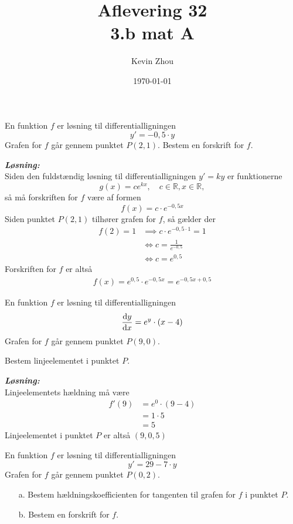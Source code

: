 \documentclass{article}
\title{Aflevering 32\\
{\Large \textbf{3.b mat A}}}
\author{Kevin Zhou}
\date{\today}
\newcommand{\sol}{\setlength{\parindent}{0cm}\textbf{\textit{Løsning:}}\setlength{\parindent}{1cm}}
\begin{document}
\maketitle
\pagebreak
\begin{question}{}{}
  En funktion $f$ er løsning til differentialligningen
  \[
  y'=-0,5 \cdot y
  \] 
  Grafen for $f$ går gennem punktet $P(2,1)$. 
  Bestem en forskrift for $f$.
\end{question}
\sol \\
Siden den fuldstændig løsning til differentialligningen $y'=ky$ er funktionerne
\[
g(x)= ce^{kx}, \quad c \in \mathbb{R}, x \in \mathbb{R},
\] 
så må forskriften for $f$ være af formen
\[
f(x)= c \cdot e^{-0,5x} 
\] 
Siden punktet $P(2,1)$ tilhører grafen for $f$, så gælder der
\begin{equation*}
\begin{split}
  f(2)= 1 &\implies c \cdot e^{-0,5 \cdot 1} =1\\ 
  &\iff c=\frac{1}{e^{-0,5} }\\ 
  &\iff c=e^{0,5} 
\end{split}
\end{equation*}
Forskriften for $f$ er altså
\begin{equation*}
\begin{split}
  f(x)= e^{0,5} \cdot e^{-0,5x} =e^{-0,5x + 0,5} 
\end{split}
\end{equation*}
\begin{question}{}{}
  En funktion $f$ er løsning til differentialligningen 
  \[
  \dv{y}{x}=e^{y} \cdot \left(x-4\right) 
  \] 
  Grafen for $f$ går gennem punktet $P(9,0)$. 

  Bestem linjeelementet i punktet $P$.
\end{question}
\sol \\
Linjeelementets hældning må være
\begin{equation*}
\begin{split}
  f'(9)&=e^{0} \cdot \left(9-4\right) \\
  &=1 \cdot 5\\ 
  &=5
\end{split}
\end{equation*}
Linjeelementet i punktet $P$ er altså $(9,0,5)$ 
\begin{question}{}{}
  En funktion $f$ er løsning til differentialligningen 
  \[
  y'=29-7 \cdot y
  \] 
  Grafen for $f$ går gennem punktet $P(0,2)$. 
  \begin{itemize}
    \item[a.] Bestem hældningskoefficienten for tangenten til grafen for $f$ i punktet $P$.
    \item[b.] Bestem en forskrift for $f$.
  \end{itemize}
\end{question}
\end{document}
